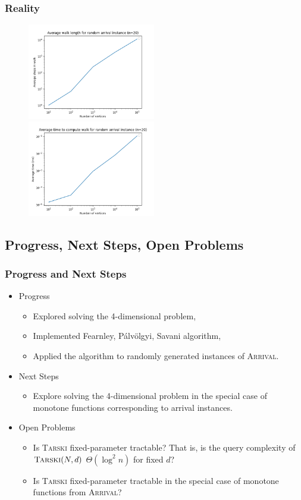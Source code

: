 \documentclass{beamer}
\begin{document}
\begin{frame}
\frametitle{Reality}
    \begin{figure}[t]
        \centering
        \includegraphics[width=2.2in]{walkLength.png}
        \centering
        \includegraphics[width=2.2in]{walkTime.png}
    \end{figure}
    
\end{frame}

\subsection{Progress, Next Steps, Open Problems}
\newcommand{\pav}{Pálvölgyi}
\begin{frame}
\frametitle{Progress and Next Steps}
    \begin{itemize}
        \item Progress
        \begin{itemize}
            \item Explored solving the 4-dimensional \trsk problem,
            \item Implemented Fearnley, \pav, Savani algorithm,
            \item Applied the algorithm to randomly generated instances of \textsc{Arrival}.
        \end{itemize}
        \item Next Steps
        \begin{itemize}
            \item Explore solving the 4-dimensional \trsk problem in the special case of monotone functions
            corresponding to arrival instances.
        \end{itemize}
      \item Open Problems
        \begin{itemize}
          \item Is \textsc{Tarski} fixed-parameter tractable? That is, is the query complexity of $\textsc{Tarski}(N, d)$ $\Theta(\log^2n)$ for fixed $d$?
          \item Is \textsc{Tarski} fixed-parameter tractable in the special case of monotone functions from \textsc{Arrival}?
        \end{itemize}
    \end{itemize}
\end{frame}
\end{document}
